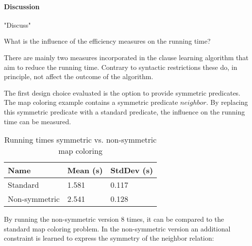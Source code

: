 \paragraph{Discussion}
"Discuss"

\begin{question}
	What is the influence of the efficiency measures on the running time?
\end{question}

There are mainly two measures incorporated in the clause learning algorithm that aim to reduce the running time.
Contrary to syntactic restrictions these do, in principle, not affect the outcome of the algorithm.

\begin{experiment}
	The first design choice evaluated is the option to provide symmetric predicates.
	The map coloring example contains a symmetric predicate $\mathit{neighbor}$.
	By replacing this symmetric predicate with a standard predicate, the influence on the running time can be measured.

	\begin{table}[!htp]
		\begin{tabularx}{\textwidth}{XXX}
			\textbf{Name}	& \textbf{Mean (s)}	& \textbf{StdDev (s)} \\
			\toprule
			Standard 		& 1.581 			& 0.117 \\
			Non-symmetric 	& 2.541 			& 0.128 \\
		\end{tabularx}
		\label{tbl:exp_speed_symm}
		\caption{Running times symmetric vs. non-symmetric map coloring}
	\end{table}

	By running the non-symmetric version $8$ times, it can be compared to the standard map coloring problem.
	In the non-symmetric version an additional constraint is learned to express the symmetry of the neighbor relation: 
\end{experiment}

